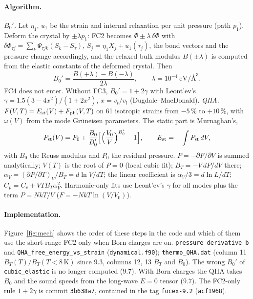 \documentclass[11pt,a4paper]{article}
\newcommand{\code}[1]{\texttt{#1}}
\begin{document}
\paragraph{Algorithm.} \emph{$B_0'$.} Let $\eta_1$, $u_1$ be the strain and internal relaxation per unit
pressure (path $p_1$). Deform the crystal by $\pm\lambda p_1$: FC2 becomes $\Phi\pm\lambda\,\delta\Phi$ with
$\delta\Phi_{\tau j}=\sum_k\Psi_{\tau jk}(S_k-S_\tau)$, $S_j=\eta_1 X_j+u_1(\tau_j)$, the bond vectors and the
pressure change accordingly, and the relaxed bulk modulus $B(\pm\lambda)$ is computed from the elastic
constants of the deformed crystal. Then
\begin{equation}
B_0'=\frac{B(+\lambda)-B(-\lambda)}{2\lambda},\qquad\lambda=10^{-4}\ \mathrm{eV}/\text{\AA}^3.
\end{equation}
FC4 does not enter. Without FC3, $B_0'=1+2\gamma$ with Leont'ev's $\gamma=1.5(3-4x^2)/(1+2x^2)$,
$x=v_t/v_l$ (Dugdale--MacDonald). \emph{QHA.} $F(V,T)=E_{\rm st}(V)+F_{\rm ph}(V,T)$ on 61 isotropic strains
from $-5$\,\% to $+10$\,\%, with $\omega(V)$ from the mode Gr\"uneisen parameters. The static part is
Murnaghan's,
\begin{equation}
P_{\rm st}(V)=P_0+\frac{B_0}{B_0'}\Big[\Big(\frac{V_0}V\Big)^{B_0'}-1\Big],\qquad E_{\rm st}=-\int P_{\rm st}\,dV ,
\end{equation}
with $B_0$ the Reuss modulus and $P_0$ the residual pressure. $P=-\partial F/\partial V$ is summed
analytically; $V(T)$ is the root of $P=0$ (local cubic fit); $B_T=-V\,dP/dV$ there;
$\alpha_V=(\partial P/\partial T)_V/B_T=d\ln V/dT$; the linear coefficient is $\alpha_V/3=d\ln L/dT$;
$C_p=C_v+VTB_T\alpha_V^2$. Harmonic-only fits use Leont'ev's $\gamma$ for all modes plus the term
$P=NkT/V$ ($F=-NkT\ln(V/V_0)$).

\paragraph{Implementation.} Figure~\ref{fig:mech} shows the order of these steps in the code and which of them use the
short-range FC2 only when Born charges are on. \code{pressure\_derivative\_b} and \code{QHA\_free\_energy\_vs\_strain}
(\code{dynamical.f90}); \code{thermo\_QHA.dat} (column 11 $B_T(T)/B_T(T{<}8\,\mathrm K)$ since 9.3, columns 12,
13 $B_T$ and $B_0$). The wrong $B_0'$ of \code{cubic\_elastic} is no longer computed (9.7). With Born charges
the QHA takes $B_0$ and the sound speeds from the long-wave $E=0$ tensor (9.7). The FC2-only rule
$1+2\gamma$ is commit \code{3b638a7}, contained in the tag \code{focex-9.2} (\code{acf1968}).
\end{document}
